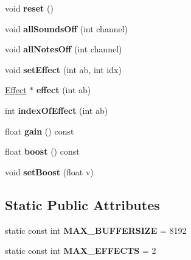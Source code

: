 \begin{DoxyCompactItemize}
void {\bfseries reset} ()
\item 
\mbox{\label{class_ms_1_1_master_synthesizer_a47a20c94609bbdf6d96ba24ae0385b93}} 
void {\bfseries all\+Sounds\+Off} (int channel)
\item 
\mbox{\label{class_ms_1_1_master_synthesizer_aa4ab7d687876e3499a73617d0c4c59d9}} 
void {\bfseries all\+Notes\+Off} (int channel)
\item 
\mbox{\label{class_ms_1_1_master_synthesizer_aac04e51f2b476cc065cd200014e66874}} 
void {\bfseries set\+Effect} (int ab, int idx)
\item 
\mbox{\label{class_ms_1_1_master_synthesizer_aed72398cd3025a9d2861f7568e882d7e}} 
\hyperlink{class_ms_1_1_effect}{Effect} $\ast$ {\bfseries effect} (int ab)
\item 
\mbox{\label{class_ms_1_1_master_synthesizer_a9cc8c04c6428bf09988acb5cc5003f2a}} 
int {\bfseries index\+Of\+Effect} (int ab)
\item 
\mbox{\label{class_ms_1_1_master_synthesizer_a94507db37d7d39e4745ddfb5311579d9}} 
float {\bfseries gain} () const
\item 
\mbox{\label{class_ms_1_1_master_synthesizer_a9a0602babd87d205195084ffb28ee605}} 
float {\bfseries boost} () const
\item 
\mbox{\label{class_ms_1_1_master_synthesizer_aa204af3ec5dd26ef35a1782a3deeba23}} 
void {\bfseries set\+Boost} (float v)
\end{DoxyCompactItemize}
\subsection*{Static Public Attributes}
\begin{DoxyCompactItemize}
\item 
\mbox{\label{class_ms_1_1_master_synthesizer_a34225050fdce5a1674fd9e922e01c8ab}} 
static const int {\bfseries M\+A\+X\+\_\+\+B\+U\+F\+F\+E\+R\+S\+I\+ZE} = 8192
\item 
\mbox{\label{class_ms_1_1_master_synthesizer_a319b679f0a9b82009432ef3ac0948b87}} 
static const int {\bfseries M\+A\+X\+\_\+\+E\+F\+F\+E\+C\+TS} = 2
\end{DoxyCompactItemize}


